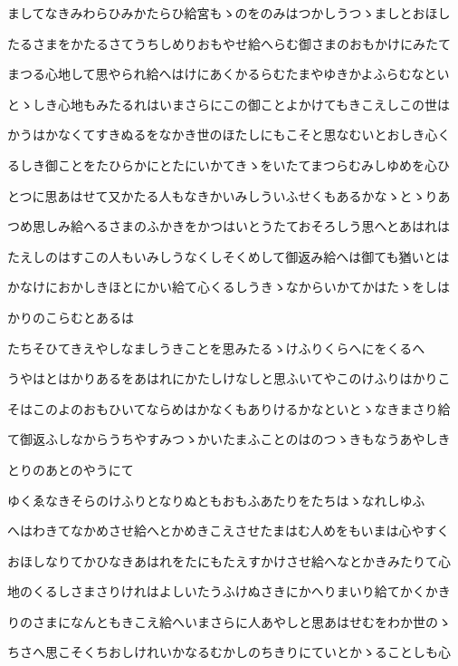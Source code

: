 \documentclass[a4paper,11pt,landscape]{ltjtarticle}
\begin{document}
ましてなきみわらひみかたらひ給宮もゝのをのみはつかしうつゝましとおほし
\par\medskip
たるさまをかたるさてうちしめりおもやせ給へらむ御さまのおもかけにみたて
\par\medskip
まつる心地して思やられ給へはけにあくかるらむたまやゆきかよふらむなとい
\par\medskip
とゝしき心地もみたるれはいまさらにこの御ことよかけてもきこえしこの世は
\par\medskip
かうはかなくてすきぬるをなかき世のほたしにもこそと思なむいとおしき心く
\par\medskip
るしき御ことをたひらかにとたにいかてきゝをいたてまつらむみしゆめを心ひ
\par\medskip
とつに思あはせて又かたる人もなきかいみしういふせくもあるかなゝとゝりあ
\par\medskip
つめ思しみ給へるさまのふかきをかつはいとうたておそろしう思へとあはれは
\par\medskip
たえしのはすこの人もいみしうなくしそくめして御返み給へは御ても猶いとは
\par\medskip
かなけにおかしきほとにかい給て心くるしうきゝなからいかてかはたゝをしは
\par\medskip
かりのこらむとあるは
\par\medskip
たちそひてきえやしなましうきことを思みたるゝけふりくらへにをくるへ
\par\medskip
うやはとはかりあるをあはれにかたしけなしと思ふいてやこのけふりはかりこ
\par\medskip
そはこのよのおもひいてならめはかなくもありけるかなといとゝなきまさり給
\par\medskip
て御返ふしなからうちやすみつゝかいたまふことのはのつゝきもなうあやしき
\par\medskip
とりのあとのやうにて
\par\medskip
ゆくゑなきそらのけふりとなりぬともおもふあたりをたちはゝなれしゆふ
\par\medskip
へはわきてなかめさせ給へとかめきこえさせたまはむ人めをもいまは心やすく
\par\medskip
おほしなりてかひなきあはれをたにもたえすかけさせ給へなとかきみたりて心
\par\medskip
地のくるしさまさりけれはよしいたうふけぬさきにかへりまいり給てかくかき
\par\medskip
りのさまになんともきこえ給へいまさらに人あやしと思あはせむをわか世のゝ
\par\medskip
ちさへ思こそくちおしけれいかなるむかしのちきりにていとかゝることしも心
\par\medskip
\end{document}
